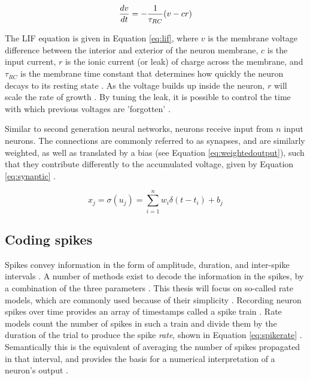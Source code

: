 \documentclass[report.tex]{subfiles}
\begin{document}
\begin{equation}
  \frac{dv}{dt} = - {1 \over \tau_{RC}} (v - cr)
  \label{eq:lif}
\end{equation}

The LIF equation is given in Equation \ref{eq:lif}, where
$v$ is the membrane voltage difference between the interior
and exterior of the neuron membrane, $c$ is the input current, $r$
is the ionic current (or leak) of charge across the membrane, and
$\tau_{RC}$ is the membrane time constant that determines how
quickly the neuron decays to its resting state \cite{Dayan2001, Eliasmith2004}.
As the voltage builds up inside the neuron, $r$ will scale the
rate of growth \cite{Eliasmith2004}.
By tuning the leak, it is possible to control the time with which
previous voltages are 'forgotten' \cite{Eliasmith2004}.

Similar to second generation neural networks, neurons
receive input from $n$ input neurons.
The connections are commonly referred to as synapses, and are similarly
weighted, as well as translated by a bias (see Equation \ref{eq:weightedoutput}),
such that they contribute differently to the accumulated 
voltage, given by Equation \ref{eq:synaptic} \cite{Dayan2001}.

\begin{equation}
  x_j = \sigma(u_j) = \sum_{i=1}^n{w_i\delta(t - t_i)} + b_j
  \label{eq:synaptic}
\end{equation}

\subsection{Coding spikes} \label{sec:coding}
Spikes convey information in the form of amplitude, duration, and
inter-spike intervals \cite{Dayan2001}.
A number of methods exist to decode the information in the spikes, by a 
combination of the three parameters \cite{Dayan2001, Eliasmith2015, Diehl2015, Rueckauer2017}.
This thesis will focus on so-called rate
models, which are commonly used because of their simplicity
\cite{Eliasmith2004}.
Recording neuron spikes over time provides an array of timestamps called a
spike train \cite{Eliasmith2015}.
Rate models count the number of spikes in such a train and divide them by the duration of
the trial to produce the spike \textit{rate}, shown
in Equation \ref{eq:spikerate} \cite{Dayan2001, Eliasmith2004}.
Semantically this is the equivalent of averaging the number of spikes propagated
in that interval, and provides the basis for a numerical interpretation of a
neuron's output \cite{Eliasmith2004}.
\end{document}

